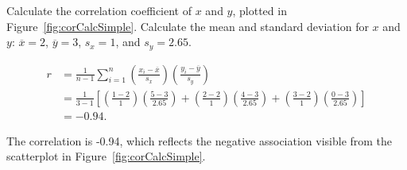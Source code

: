 \begin{examplewrap}
\begin{nexample}{Calculate the correlation coefficient of $x$ and $y$, plotted in Figure~\ref{fig:corCalcSimple}.} Calculate the mean and standard deviation for $x$ and $y$: $\overline{x} = 2$, $\overline{y} = 3$, $s_x = 1$, and $s_y = 2.65$. 

\begin{align*}
r &=  \frac{1}{n-1}\sum^{n}_{i=1}
\left(\frac{x_{i}-\overline{x}}
{s_{x}}\right)\left(\frac{y_{i}-\overline{y}}{s_{y}}\right) \\
&= \frac{1}{3 - 1} \left[\left(\frac{1 - 2}
{1}\right)\left(\frac{5 - 3}{2.65}\right) + \left(\frac{2 - 2}
{1}\right)\left(\frac{4 - 3}{2.65}\right) + \left(\frac{3 - 2}
{1}\right)\left(\frac{0 - 3}{2.65}\right)  \right] \\
&= -0.94.
\end{align*}

The correlation is -0.94, which reflects the negative association visible from the scatterplot in Figure~\ref{fig:corCalcSimple}.
	

\end{nexample}
\end{examplewrap}

